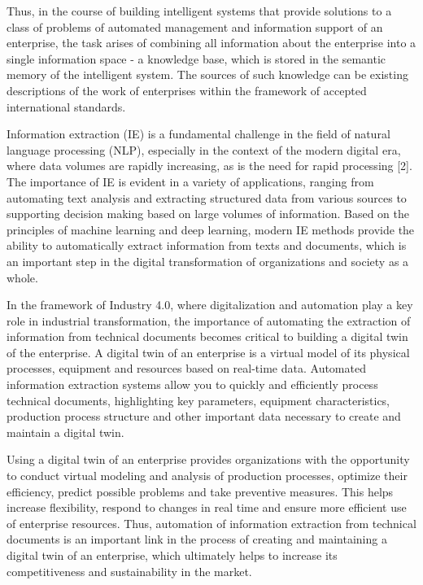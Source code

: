 \documentclass{article}
\begin{document}
\begin{SCn}
\begin{multicols}
Thus, in the course of building intelligent systems that
provide solutions to a class of problems of automated
management and information support of an enterprise,
the task arises of combining all information about the
enterprise into a single information space - a knowledge
base, which is stored in the semantic memory of the
intelligent system. The sources of such knowledge can
be existing descriptions of the work of enterprises within
the framework of accepted international standards.

Information extraction (IE) is a fundamental challenge
in the field of natural language processing (NLP), especially in the context of the modern digital era, where
data volumes are rapidly increasing, as is the need for
rapid processing [2]. The importance of IE is evident
in a variety of applications, ranging from automating
text analysis and extracting structured data from various
sources to supporting decision making based on large
volumes of information. Based on the principles of
machine learning and deep learning, modern IE methods
provide the ability to automatically extract information
from texts and documents, which is an important step in
the digital transformation of organizations and society as
a whole.

In the framework of Industry 4.0, where digitalization
and automation play a key role in industrial transformation, the importance of automating the extraction of
information from technical documents becomes critical
to building a digital twin of the enterprise. A digital twin
of an enterprise is a virtual model of its physical processes, equipment and resources based on real-time data.
Automated information extraction systems allow you
to quickly and efficiently process technical documents,
highlighting key parameters, equipment characteristics,
production process structure and other important data
necessary to create and maintain a digital twin.

Using a digital twin of an enterprise provides organizations with the opportunity to conduct virtual modeling
and analysis of production processes, optimize their
efficiency, predict possible problems and take preventive measures. This helps increase flexibility, respond
to changes in real time and ensure more efficient use
of enterprise resources. Thus, automation of information
extraction from technical documents is an important link
in the process of creating and maintaining a digital twin
of an enterprise, which ultimately helps to increase its
competitiveness and sustainability in the market.


\end{multicols}
\end{SCn}
\end{document}
